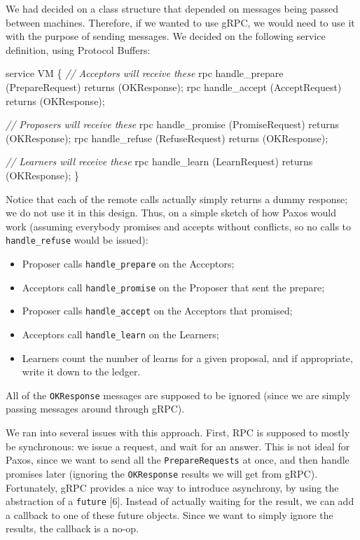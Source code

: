 \documentclass[12pt,]{article}
\newenvironment{Shaded}{\begin{snugshade}}{\end{snugshade}}
\newcommand{\CommentTok}[1]{\textcolor[rgb]{0.56,0.35,0.01}{\textit{{#1}}}}
\newcommand{\NormalTok}[1]{{#1}}
\providecommand{\tightlist}{%
  \setlength{\itemsep}{0pt}\setlength{\parskip}{0pt}}
\begin{document}
We had decided on a class structure that depended on messages being
passed between machines. Therefore, if we wanted to use gRPC, we would
need to use it with the purpose of sending messages. We decided on the
following service definition, using Protocol Buffers:

\begin{Shaded}
\begin{Highlighting}[]
\NormalTok{service VM \{}
    \CommentTok{// Acceptors will receive these}
    \NormalTok{rpc handle_prepare (PrepareRequest) returns (OKResponse);}
    \NormalTok{rpc handle_accept (AcceptRequest) returns (OKResponse);}

    \CommentTok{// Proposers will receive these}
    \NormalTok{rpc handle_promise (PromiseRequest) returns (OKResponse);}
    \NormalTok{rpc handle_refuse (RefuseRequest) returns (OKResponse);}

    \CommentTok{// Learners will receive these}
    \NormalTok{rpc handle_learn (LearnRequest) returns (OKResponse);}
\NormalTok{\}}
\end{Highlighting}
\end{Shaded}

Notice that each of the remote calls actually simply returns a dummy
response; we do not use it in this design. Thus, on a simple sketch of
how Paxos would work (assuming everybody promises and accepts without
conflicts, so no calls to \texttt{handle\_refuse} would be issued):

\begin{itemize}
\tightlist
\item
  Proposer calls \texttt{handle\_prepare} on the Acceptors;
\item
  Acceptors call \texttt{handle\_promise} on the Proposer that sent the
  prepare;
\item
  Proposer calls \texttt{handle\_accept} on the Acceptors that promised;
\item
  Acceptors call \texttt{handle\_learn} on the Learners;
\item
  Learners count the number of learns for a given proposal, and if
  appropriate, write it down to the ledger.
\end{itemize}

All of the \texttt{OKResponse} messages are supposed to be ignored
(since we are simply passing messages around through gRPC).

We ran into several issues with this approach. First, RPC is supposed to
mostly be synchronous: we issue a request, and wait for an answer. This
is not ideal for Paxos, since we want to send all the
\texttt{PrepareRequests} at once, and then handle promises later
(ignoring the \texttt{OKResponse} results we will get from gRPC).
Fortunately, gRPC provides a nice way to introduce asynchrony, by using
the abstraction of a \texttt{future} {[}6{]}. Instead of actually
waiting for the result, we can add a callback to one of these future
objects. Since we want to simply ignore the results, the callback is a
no-op.
\end{document}
